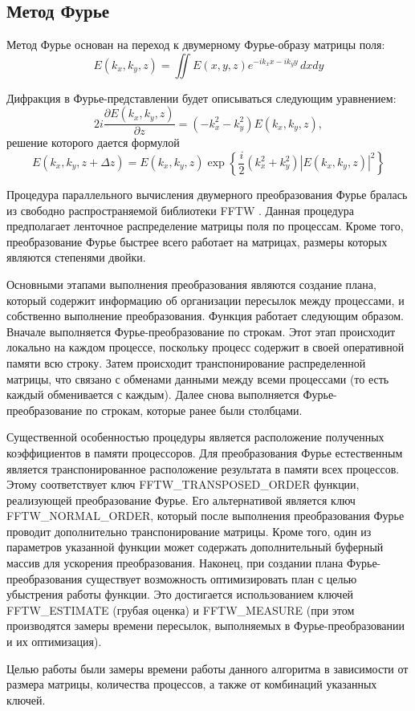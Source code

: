 \subsection{Метод Фурье}

Метод Фурье основан на переход к двумерному Фурье-образу матрицы поля:
\begin{equation}\label{FourierDef}
    E\left(k_x, k_y, z\right)=\iint E\left(x,y,z\right)e^{-ik_xx-ik_yy}\,dxdy
\end{equation}

Дифракция в Фурье-представлении будет описываться следующим уравнением:
\begin{equation}\label{DiffractionFourier}
    2i\frac{\partial E\left(k_x, k_y, z\right)}{\partial z}= (-k_x^2-k_y^2)E\left(k_x, k_y, z\right),
\end{equation}
решение которого дается формулой
\begin{equation}\label{DiffractionFourierSolve}
    E\left(k_x, k_y, z+\Delta z\right)= E\left(k_x, k_y, z\right)\exp\left\{\dfrac{i}{2}(k_x^2+k_y^2)\left|E\left(k_x, k_y, z\right)\right|^2\right\}
\end{equation}

Процедура параллельного вычисления двумерного преобразования Фурье бралась из свободно распространяемой библиотеки FFTW \cite{fftw}.
Данная процедура предполагает ленточное распределение матрицы поля по процессам.
Кроме того, преобразование Фурье быстрее всего работает на матрицах, размеры которых являются степенями двойки.

Основными этапами выполнения преобразования являются создание плана, который содержит информацию об организации пересылок между процессами, и собственно выполнение преобразования.
Функция работает следующим образом.
Вначале выполняется Фурье-преобразование по строкам.
Этот этап происходит локально на каждом процессе, поскольку процесс содержит в своей оперативной памяти всю строку.
Затем происходит транспонирование распределенной матрицы, что связано с обменами данными между всеми процессами (то есть каждый обменивается с каждым).
Далее снова выполняется Фурье-преобразование по строкам, которые ранее были столбцами.

Существенной особенностью процедуры является расположение полученных коэффициентов в памяти процессоров.
Для преобразования Фурье естественным является транспонированное расположение результата в памяти всех процессов.
Этому соответствует ключ FFTW\_TRANSPOSED\_ORDER функции, реализующей преобразование Фурье.
Его альтернативой является ключ FFTW\_NORMAL\_ORDER, который после выполнения преобразования Фурье проводит дополнительно транспонирование матрицы.
Кроме того, один из параметров указанной функции может содержать дополнительный буферный массив для ускорения преобразования.
Наконец, при создании плана Фурье-преобразования существует возможность оптимизировать план с целью убыстрения работы функции.
Это достигается использованием ключей FFTW\_ESTIMATE (грубая оценка) и FFTW\_MEASURE (при этом производятся замеры времени пересылок, выполняемых в Фурье-преобразовании и их оптимизация).

Целью работы были замеры времени работы данного алгоритма в зависимости от размера матрицы, количества процессов, а также от комбинаций указанных ключей.
